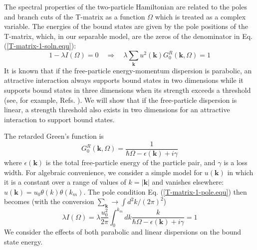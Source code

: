 \documentclass[aps,prb,superscriptaddress,letterpaper,amsmath,amssymb,twocolumn,preprintnumbers]{revtex4}
\begin{document}
The spectral properties of the two-particle Hamiltonian are related to the poles and branch cuts of the T-matrix as a function $\Omega$ which is treated as a complex variable. The energies of the bound states are given by the pole positions of the T-matrix, which, in our separable model, are the zeros of the denominator in Eq. (\ref{T-matrix-1-soln.equ}):
\begin{equation}\label{T-matrix-1-pole.equ}
1 - \lambda I(\Omega) = 0 \quad \Rightarrow \quad \lambda \sum_{\mathbf{k}} u^2(\mathbf{k})G_{0}^{R}(\mathbf{k},\Omega) = 1
\end{equation}
It is known that if the free-particle energy-momentum dispersion is parabolic, an attractive interaction always supports bound states in two dimensions while it supports bound states in three dimensions when its strength exceeds a threshold
(see, for example, Refs. ). We will show that if the free-particle dispersion is linear, a strength threshold also exists in two dimensions for an attractive interaction to support bound states.

The retarded Green's function is
\begin{equation}\label{G_0.equ}
G_{0}^{R}(\mathbf{k},\Omega) = \frac {1} {\hbar \Omega - \epsilon(\mathbf{k}) + i \gamma}
\end{equation}
where $\epsilon(\mathbf{k})$ is the total free-particle energy of the particle pair, and $\gamma$ is a loss width. For algebraic convenience, we consider a simple model for $u(\mathbf{k})$ in which it is a constant over a range of values of $k=|\mathbf{k}|$ and vanishes elsewhere: $u(\mathbf{k}) = u_0 \theta(k) \theta(k_m)$. The pole condition Eq. (\ref{T-matrix-1-pole.equ}) then becomes (with the conversion $\sum_\mathbf{k} \rightarrow \int d^2 k / ( 2 \pi )^2$)
\begin{equation}\label{T-matrix-1-pole-a.equ}
\lambda I(\Omega) = \lambda \frac {u^2_0} {2 \pi} \int^{k_m}_0 d k \frac {k} {\hbar \Omega - \epsilon(\mathbf{k}) + i \gamma} = 1
\end{equation}
We consider the effects of both parabolic and linear dispersions on the bound state energy.\\
\end{document}
